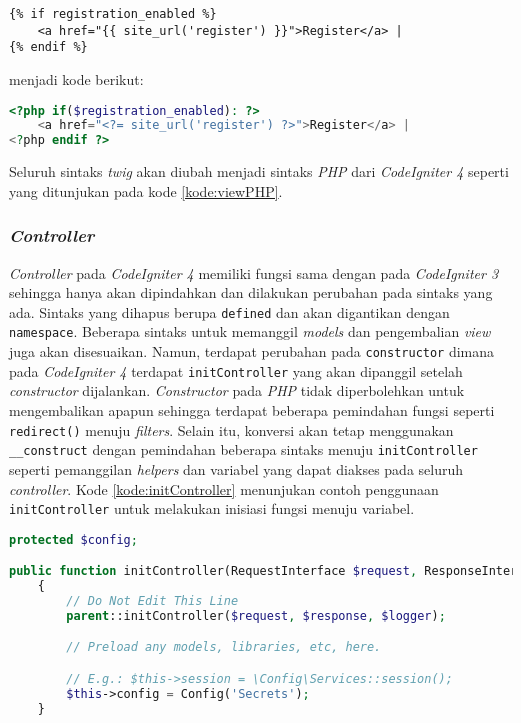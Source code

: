 \begin{lstlisting}[caption=Contoh \textit{view} menggunakan \textit{twig}, label=kode:viewTwig]
{% if registration_enabled %}
	<a href="{{ site_url('register') }}">Register</a> |
{% endif %}
\end{lstlisting}

menjadi kode berikut:

\begin{lstlisting}[language=PHP, caption=Contoh \textit{view} menggunakan \textit{php}, label=kode:viewPHP]
<?php if($registration_enabled): ?>
	<a href="<?= site_url('register') ?>">Register</a> |
<?php endif ?>
\end{lstlisting}

Seluruh sintaks \textit{twig} akan diubah menjadi sintaks \textit{PHP} dari \textit{CodeIgniter 4} seperti yang ditunjukan pada kode \ref{kode:viewPHP}.

\subsubsection{\textit{Controller}}
\textit{Controller} pada \textit{CodeIgniter 4} memiliki fungsi sama dengan pada \textit{CodeIgniter 3} sehingga hanya akan dipindahkan dan dilakukan perubahan pada sintaks yang ada. Sintaks yang dihapus berupa \texttt{defined} dan akan digantikan dengan \texttt{namespace}. Beberapa sintaks untuk memanggil \textit{models} dan pengembalian \textit{view} juga akan disesuaikan. Namun, terdapat perubahan pada \texttt{constructor} dimana pada \textit{CodeIgniter 4} terdapat \texttt{initController} yang akan dipanggil setelah \textit{constructor} dijalankan. \textit{Constructor} pada \textit{PHP} tidak diperbolehkan untuk mengembalikan apapun sehingga terdapat beberapa pemindahan fungsi seperti \texttt{redirect()} menuju \textit{filters}. Selain itu, konversi akan tetap menggunakan \verb|__construct| dengan pemindahan beberapa sintaks menuju \texttt{initController} seperti pemanggilan \textit{helpers} dan variabel yang dapat diakses pada seluruh \textit{controller}. Kode \ref{kode:initController} menunjukan contoh penggunaan \texttt{initController} untuk melakukan inisiasi fungsi menuju variabel.

\begin{lstlisting}[language=PHP, caption=Penggunaan initController untuk inisiasi fungsi menuju variabel, label=kode:initController]
protected $config;

public function initController(RequestInterface $request, ResponseInterface $response, LoggerInterface $logger)
    {
        // Do Not Edit This Line
        parent::initController($request, $response, $logger);

        // Preload any models, libraries, etc, here.

        // E.g.: $this->session = \Config\Services::session();
        $this->config = Config('Secrets');
    }
\end{lstlisting}

